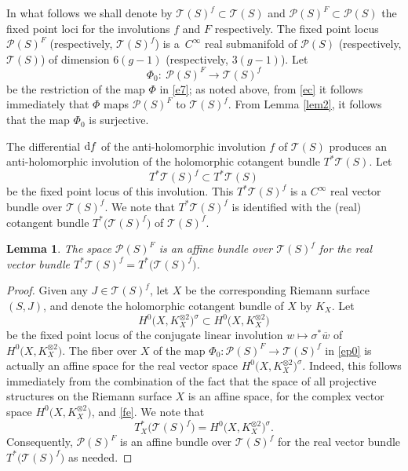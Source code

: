 \documentclass[10pt,a4paper]{amsart}
\numberwithin{equation}{section}
\newtheorem{Lemma}[Theorem]{Lemma}
\begin{document}
In what follows we shall denote by
${\mathcal T}(S)^f \subset {\mathcal T}(S)$ and $ {\mathcal P}(S)^F \subset {\mathcal P}(S)$
 the fixed point loci for the involutions $f$ and $F$ respectively. The fixed point locus ${\mathcal P}(S)^F$ \big(respectively, ${\mathcal T}(S)^f$\big) is a~$C^\infty$ real
submanifold of ${\mathcal P}(S)$ (respectively, ${\mathcal T}(S)$) of dimension $6(g-1)$
(respectively, $3(g-1)$). Let
\begin{equation}\label{ep0}
\Phi_0\colon\ {\mathcal P}(S)^F \longrightarrow {\mathcal T}(S)^f
\end{equation}
be the restriction of the map $\Phi$ in \eqref{e7}; as noted above, from \eqref{ec} it follows immediately that
$\Phi$ maps ${\mathcal P}(S)^F$ to ${\mathcal T}(S)^f$. From Lemma \ref{lem2}, it follows that the map
$\Phi_0$ is surjective.

The differential ${\rm d}f$ of the anti-holomorphic involution $f$ of ${\mathcal T}(S)$ produces an anti-holomorphic
involution of the holomorphic cotangent bundle $T^*{\mathcal T}(S)$. Let
\[
T^*{\mathcal T}(S)^f \subset T^*{\mathcal T}(S)
\]
be the fixed point locus of this involution. This $T^*{\mathcal T}(S)^f$ is a $C^\infty$ real
vector bundle over ${\mathcal T}(S)^f$. We note that $T^*{\mathcal T}(S)^f$ is identified with the (real) cotangent
bundle $T^*\big({\mathcal T}(S)^f\big)$ of ${\mathcal T}(S)^f$.

\begin{Lemma} \label{affinebun}The space ${\mathcal P}(S)^F$ is an affine bundle over
${\mathcal T}(S)^f$ for the real vector bundle $T^*{\mathcal T}(S)^f = T^*\bigl({\mathcal T}(S)^f\bigr)$.
\end{Lemma}

\begin{proof}
Given any $J \in {\mathcal T}(S)^f$, let $X$ be the corresponding Riemann surface $(S, J)$, and denote the
holomorphic cotangent bundle of $X$ by $K_X$. Let
\[
H^0\bigl(X, K^{\otimes 2}_X\bigr)^\sigma \subset H^0\bigl(X, K^{\otimes 2}_X\bigr)
\]
be the fixed point locus of the conjugate linear involution $w \longmapsto \sigma^*\overline{w}$
of $H^0\bigl(X, K^{\otimes 2}_X\bigr)$. The fiber over $X$ of the map $\Phi_0\colon \mathcal P(S)^F
 \longrightarrow {\mathcal T}(S)^f$ in \eqref{ep0} is actually an affine space for
the real vector space $H^0\bigl(X, K^{\otimes 2}_X\bigr)^\sigma$. Indeed, this follows
immediately from the combination of the fact that
the space of all projective structures on the Riemann surface $X$ is an affine
space, for the complex vector space $H^0\bigl(X, K^{\otimes 2}_X\bigr)$, and \eqref{fe}.
We note that
\[
T^*_X \bigl({\mathcal T}(S)^f\bigr) = H^0\bigl(X, K^{\otimes 2}_X\bigr)^\sigma.\]
Consequently, ${\mathcal P}(S)^F$ is an affine bundle over
${\mathcal T}(S)^f$ for the real vector bundle $T^*\bigl({\mathcal T}(S)^f\bigr)$ as needed.
\end{proof}
\end{document}
